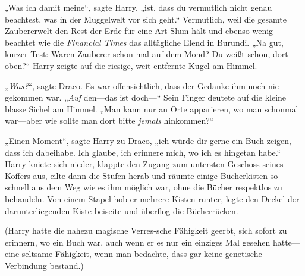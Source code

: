 „Was ich damit meine“, sagte Harry, „ist, dass du vermutlich nicht genau beachtest, was in der Muggelwelt vor sich geht.“ Vermutlich, weil die gesamte Zaubererwelt den Rest der Erde für eine Art Slum hält und ebenso wenig beachtet wie die \emph{Financial Times} das alltägliche Elend in Burundi. „Na gut, kurzer Test: Waren Zauberer schon mal auf dem Mond? Du weißt schon, dort oben?“ Harry zeigte auf die riesige, weit entfernte Kugel am Himmel.

„\emph{Was?}“, sagte Draco. Es war offensichtlich, dass der Gedanke ihm noch nie gekommen war. „\emph{Auf} den—das ist doch—“ Sein Finger deutete auf die kleine blasse Sichel am Himmel. „Man kann nur an Orte apparieren, wo man schonmal war—aber wie sollte man dort bitte \emph{jemals} hinkommen?“

„Einen Moment“, sagte Harry zu Draco, „ich würde dir gerne ein Buch zeigen, dass ich dabeihabe. Ich glaube, ich erinnere mich, wo ich es hingetan habe.“ Harry kniete sich nieder, klappte den Zugang zum untersten Geschoss seines Koffers aus, eilte dann die Stufen herab und räumte einige Bücherkisten so schnell aus dem Weg wie es ihm möglich war, ohne die Bücher respektlos zu behandeln. Von einem Stapel hob er mehrere Kisten runter, legte den Deckel der darunterliegenden Kiste beiseite und überflog die Bücherrücken.

(Harry hatte die nahezu magische Verres-sche Fähigkeit geerbt, sich sofort zu erinnern, wo ein Buch war, auch wenn er es nur ein einziges Mal gesehen hatte—eine seltsame Fähigkeit, wenn man bedachte, dass gar keine genetische Verbindung bestand.)


